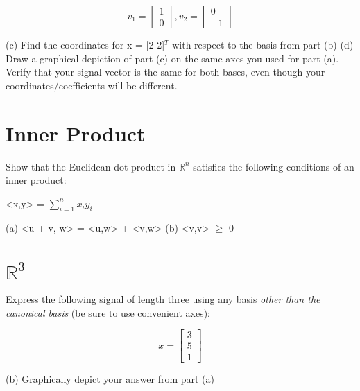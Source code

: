 \documentclass[11pt]{article}
\begin{document}
\begin{center}
\[
v_1 = 
\begin{bmatrix}
   1 \\
   0          
\end{bmatrix},
v_2= 
\begin{bmatrix}
   0 \\
   -1          
\end{bmatrix}
\]
\end{center}

(c) Find the coordinates for x = [2 2]$^T$ with respect to the basis from part (b)\newline
(d) Draw a graphical depiction of part (c) on the same axes you used for part (a). Verify that your signal vector is the same for both bases, even though your coordinates/coefficients will be different.

\vspace{4mm}

\section{Inner Product}
Show that the Euclidean dot product in $\mathbb{R}^{n}$ satisfies the following conditions of an inner product:\newline

\begin{center}

<x,y> = $\sum_{i = 1}^{n} x_i y_i $

\end{center}

(a) <u + v, w> = <u,w> + <v,w>\newline
(b) <v,v> $\geq$ 0

\vspace{4mm}

\section{$\mathbb{R}^3$}
Express the following signal of length three using any basis \emph{other than the canonical basis} (be sure to use convenient axes):

\begin{center}


\[
x = 
\begin{bmatrix}
   3 \\
   5 \\
   1         
\end{bmatrix}
\]


\end{center}

(b) Graphically depict your answer from part (a)
\end{document}
